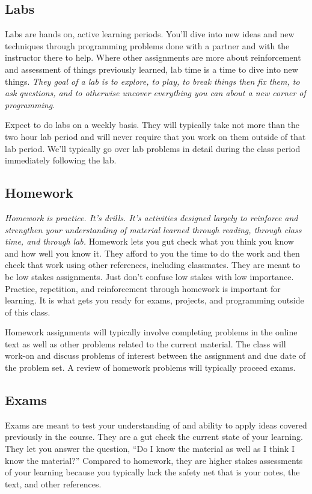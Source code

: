 \documentclass[10pt]{article}
\begin{document}
\subsection*{Labs}

Labs are hands on, active learning periods. You'll dive into new ideas and new techniques through programming problems done with a partner and with the instructor there to help. Where other assignments are more about reinforcement and assessment of things previously learned, lab time is a time to dive into new things. \textit{They goal of a lab is to explore, to play, to break things then fix them, to ask questions, and to otherwise uncover everything you can about a new corner of programming.}

Expect to do labs on a weekly basis. They will typically take not more than the two hour lab period and will never require that you work on them outside of that lab period. We'll typically go over lab problems in detail during the class period immediately following the lab.

\subsection*{Homework}

\textit{Homework is practice. It's drills. It's activities designed largely to reinforce and strengthen your understanding of material learned through reading, through class time, and through lab.} Homework lets you gut check what you think you know and how well you know it. They afford to you the time to do the work and then check that work using other references, including classmates. They are meant to be low stakes assignments.  Just don't confuse low stakes with low importance. Practice, repetition, and reinforcement through homework is important for learning. It is what gets you ready for exams, projects, and programming outside of this class.

Homework assignments will typically involve completing problems in the online text as well as other problems related to the current material. The class will work-on and discuss problems of interest between the assignment and due date of the problem set. A review of homework problems will typically proceed exams.

\subsection*{Exams}

Exams are meant to test your understanding of and ability to apply ideas covered previously in the course. They are a gut check the current state of your learning. They let you answer the question, ``Do I know the material as well as I think I know the material?''  Compared to homework, they are higher stakes assessments of your learning because you typically lack the safety net that is your notes, the text, and other references.
\end{document}
